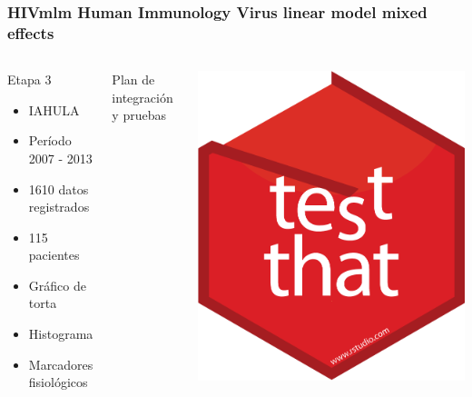 \documentclass{beamer}%
\begin{document}
\begin{frame}
\frametitle{\textbf{HIVmlm Human Immunology Virus linear model mixed effects}}
\begin{columns}[t]
 \begin{block}{Etapa 3}
  	\begin{itemize}
  	\item IAHULA
  	\item Per\'iodo 2007 - 2013
  	\item 1610 datos registrados
  	\item 115 pacientes
  	\item Gr\'afico de torta
  	\item Histograma
  	\item Marcadores fisiol\'ogicos
  	\end{itemize}
  	\end{block}
    Plan de integraci\'on y pruebas
    \begin{center}\includegraphics[height=0.4\textheight]{testthat.png}\end{center}
  \end{columns}
\end{frame}
\end{document}
